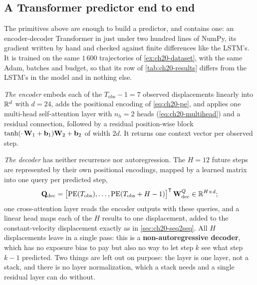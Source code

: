 \subsection{A Transformer predictor end to end}
\label{sec:ch20-transformer-model}

The primitives above are enough to build a predictor, and
 contains one: an encoder-decoder Transformer in
just under two hundred lines of NumPy, its gradient written by hand and
checked against finite differences like the LSTM's. It is trained on the same
$1\,600$ trajectories of \cref{ex:ch20-dataset}, with the same Adam, batches
and budget, so that its row of \cref{tab:ch20-results} differs from the
LSTM's in the model and in nothing else.

\emph{The encoder} embeds each of the $T_{\mathrm{obs}} - 1 = 7$ observed
displacements linearly into $\mathbb{R}^{d}$ with $d = 24$, adds the positional
encoding of \cref{eq:ch20-pe}, and applies one multi-head self-attention layer
with $n_h = 2$ heads (\cref{eq:ch20-multihead}) and a residual connection,
followed by a residual position-wise block
$\tanh(\cdot\,\mathbf{W}_1 + \mathbf{b}_1)\mathbf{W}_2 + \mathbf{b}_2$ of width $2d$. It
returns one context vector per observed step.

\emph{The decoder} has neither recurrence nor autoregression. The $H = 12$
future steps are represented by their own positional encodings, mapped by a
learned matrix into one query per predicted step,
\begin{equation}
  \mathbf{Q}_{\mathrm{dec}} = \bigl[\mathrm{PE}(T_{\mathrm{obs}}), \dots, \mathrm{PE}(T_{\mathrm{obs}} + H - 1)\bigr]^{\mathsf{T}}\,\mathbf{W}^{Q}_{\mathrm{dec}} \in \mathbb{R}^{H \times d};
  \label{eq:ch20-decoder-queries}
\end{equation}
one cross-attention layer reads the encoder outputs with these queries, and a
linear head maps each of the $H$ results to one displacement, added to the
constant-velocity displacement exactly as in \cref{sec:ch20-seq2seq}. All $H$
displacements leave in a single pass: this is a \textbf{non-autoregressive
decoder},
which has no exposure bias to pay but also no way to let step $k$ see what
step $k-1$ predicted. Two things are left out on purpose: the layer is one
layer, not a stack, and there is no layer normalization, which a stack needs
and a single residual layer can do without.

